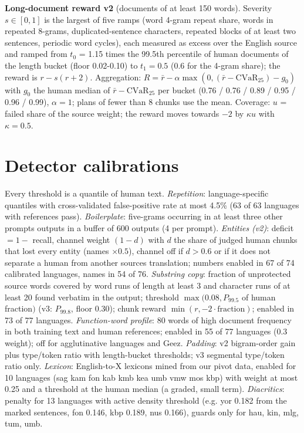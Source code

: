 \textbf{Long-document reward v2} (documents of at least 150 words). Severity \(s\in[0,1]\) is the largest of five ramps (word 4-gram repeat share, words in repeated 8-grams, duplicated-sentence characters, repeated blocks of at least two sentences, periodic word cycles), each measured as excess over the English source and ramped from \(t_0\) = 1.15 times the 99.5th percentile of human documents of the length bucket (floor 0.02-0.10) to \(t_1=0.5\) (0.6 for the 4-gram share); the reward is \(r-s(r+2)\). Aggregation: \(R=\bar r-\alpha\max(0,(\bar r-\mathrm{CVaR}_{25})-g_0)\) with \(g_0\) the human median of \(\bar r-\mathrm{CVaR}_{25}\) per bucket (0.76 / 0.76 / 0.89 / 0.95 / 0.96 / 0.99), \(\alpha=1\); plans of fewer than 8 chunks use the mean. Coverage: \(u\) = failed share of the source weight; the reward moves towards \(-2\) by \(\kappa u\) with \(\kappa=0.5\).

\section{Detector calibrations}\label{detector-calibrations}

Every threshold is a quantile of human text. \emph{Repetition}: language-specific quantiles with cross-validated false-positive rate at most 4.5\% (63 of 63 languages with references pass). \emph{Boilerplate}: five-grams occurring in at least three other prompts\textquotesingle{} outputs in a buffer of 600 outputs (4 per prompt). \emph{Entities (v2)}: deficit \(=1-\) recall, channel weight \((1-d)\) with \(d\) the share of judged human chunks that lost every entity (names \(\times 0.5\)), channel off if \(d>0.6\) or if it does not separate a human from another source\textquotesingle s translation; numbers enabled in 67 of 74 calibrated languages, names in 54 of 76. \emph{Substring copy}: fraction of unprotected source words covered by word runs of length at least 3 and character runs of at least 20 found verbatim in the output; threshold \(\max(0.08, P_{99.5}\) of human fraction\()\) (v3: \(P_{99.8}\), floor 0.30); chunk reward \(\min(r,-2\cdot\text{fraction})\); enabled in 73 of 77 languages. \emph{Function-word profile}: 80 words of high document frequency in both training text and human references; enabled in 55 of 77 languages (0.3 weight); off for agglutinative languages and Ge\textquotesingle ez. \emph{Padding}: v2 bigram-order gain plus type/token ratio with length-bucket thresholds; v3 segmental type/token ratio only. \emph{Lexicon}: English-to-X lexicons mined from our pivot data, enabled for 10 languages (sag kam fon kab kmb kea umb vmw mos kbp) with weight at most 0.25 and a threshold at the human median (a graded, small term). \emph{Diacritics}: penalty for 13 languages with active density threshold (e.g. yor 0.182 from the marked sentences, fon 0.146, kbp 0.189, nus 0.166), guards only for hau, kin, mlg, tum, umb.

